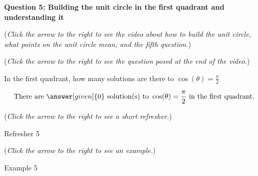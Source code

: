 \documentclass{ximera}
\begin{document}
\textbf{Question 5: Building the unit circle in the first quadrant and understanding it}
\begin{question}
\begin{flushright}
{\color{blue}(\emph{Click the arrow to the right to see
the
video about how to build the unit circle, what points
on the
unit circle mean, and the fifth question.})}
\end{flushright}
\begin{center}
\begin{expandable}
{\color{blue}(\emph{Click the arrow to the right to see the question
posed at the end of the video.})}
\begin{expandable}
In the first quadrant, how many solutions are there to $\cos(\theta) = \frac{\pi}{2}$
\begin{prompt}
\[
\text{ There are }\answer[given]{0}\text{ solution(s)
to }\cos(\theta)=\frac{\pi}{2}\text{ in the first quadrant.}
\]
\end{prompt}
\begin{flushright}
{\color{blue}(\emph{Click the arrow to the right to see a short refresher.})}
\end{flushright}
\begin{expandable}
Refresher 5
\end{expandable}
\begin{flushright}
{\color{blue}(\emph{Click the arrow to the right to see an example.})}
\end{flushright}
\begin{expandable}
Example 5
\end{expandable}
\end{expandable}
\end{expandable}
\end{center}
\end{question}
\end{document}
